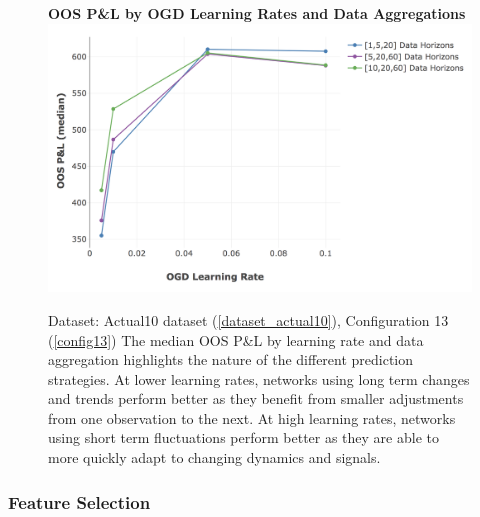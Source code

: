 \documentclass[a4paper,11pt,oneside]{article}
\theoremstyle{plain}
\theoremstyle{definition}
\begin{document}
	\begin{figure}[H]
		\textbf{OOS P\&L by OGD Learning Rates and Data Aggregations}
		\centering
		\includegraphics[scale=0.45]{images/results/primary/OOS_OGDLR_Delta_PL_median.png}
		\caption[OOS P\&L by OGD Learning Rates and Data Aggregations]{Dataset: Actual10 dataset (\ref{dataset_actual10}), Configuration 13 (\ref{config13})
			\newline The median OOS P\&L by learning rate and data aggregation highlights the nature of the different prediction strategies. At lower learning rates, networks using long term changes and trends perform better as they benefit from smaller adjustments from one observation to the next. At high learning rates, networks using short term fluctuations perform better as they are able to more quickly adapt to changing dynamics and signals.}
		\label{figure-actual_ogd_lr_data}
	\end{figure}
	
	\subsubsection{Feature Selection}
	
	
		
\end{document}
